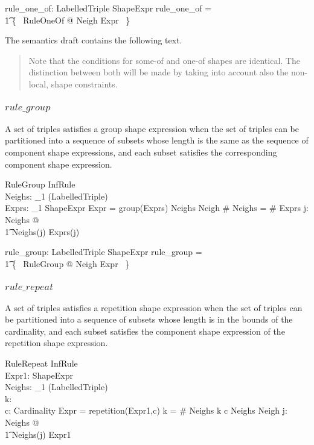 \documentclass{article}
\begin{document}
\begin{axdef}
	rule\_one\_of: \finset LabelledTriple \rel ShapeExpr
\where
	rule\_one\_of = \\
\t1		\{~ RuleOneOf @ Neigh \mapsto Expr ~\}
\end{axdef}

The semantics draft contains the following text.
\begin{quote}
Note that the conditions for some-of and one-of shapes are identical. 
The distinction between both will be made by taking into account also the non-local, shape constraints.
\end{quote}

\subsubsection{$rule\_group$}
A set of triples satisfies a group shape expression when the set of triples can be partitioned into a sequence of subsets whose length
is the same as the sequence of component shape expressions, and each subset satisfies the corresponding component shape expression.
\begin{schema}{RuleGroup}
	InfRule \\
	Neighs: \seq_1 (\finset LabelledTriple) \\
	Exprs: \seq_1 ShapeExpr
\where
	Expr = group(Exprs)
\also
	Neighs \partition Neigh
\also
	\# Neighs = \# Exprs
\also
	\forall j: \dom Neighs @ \\
\t1		Neighs(j)  Exprs(j)
\end{schema}

\begin{axdef}
	rule\_group: \finset LabelledTriple \rel ShapeExpr
\where
	rule\_group = \\
\t1		\{~ RuleGroup @ Neigh \mapsto Expr ~\}
\end{axdef}

\subsubsection{$rule\_repeat$}
A set of triples satisfies a repetition shape expression when the set of triples can be partitioned into a sequence of subsets whose length is
in the bounds of the cardinality, and each subset satisfies the component shape expression of the repetition shape expression.
\begin{schema}{RuleRepeat}
	InfRule \\
	Expr1: ShapeExpr \\
	Neighs: \seq_1 (\finset LabelledTriple) \\
	k: \nat \\
	c: Cardinality
\where
	Expr = repetition(Expr1,c)
\also
	k = \# Neighs
\also
	k  c
\also
	Neighs \partition Neigh
\also
	\forall j: \dom Neighs @ \\
\t1		Neighs(j)  Expr1
\end{schema}
\end{document}
